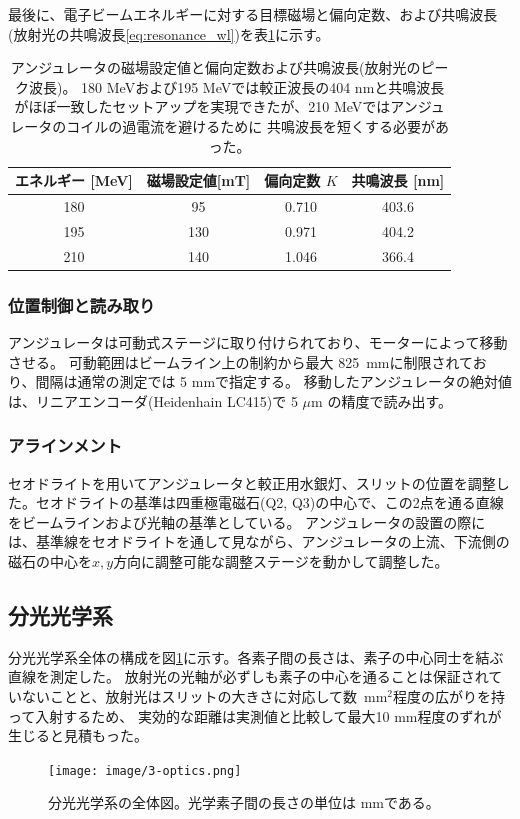 \documentclass[a4paper,11pt,uplatex]{jsbook}
\begin{document}
最後に、電子ビームエネルギーに対する目標磁場と偏向定数、および共鳴波長(放射光の共鳴波長\ref{eq:resonance_wl})を表\ref{undulator_setting}に示す。
\begin{table}[H]
  \centering
  \begin{tabular}{c|ccc}
    エネルギー [MeV]& 磁場設定値[mT]&偏向定数 $K$&共鳴波長 [nm]\\ \hline
    180 & 95  & 0.710 & 403.6\\
    195 & 130 & 0.971 & 404.2\\
    210 & 140 & 1.046 & 366.4\\
  \end{tabular}
  \caption[アンジュレータの磁場設定値]{アンジュレータの磁場設定値と偏向定数および共鳴波長(放射光のピーク波長)。
  180 MeVおよび195 MeVでは較正波長の404 nmと共鳴波長がほぼ一致したセットアップを実現できたが、210 MeVではアンジュレータのコイルの過電流を避けるために
  共鳴波長を短くする必要があった。}\label{undulator_setting}
\end{table}

\subsubsection{位置制御と読み取り}
アンジュレータは可動式ステージに取り付けられており、モーターによって移動させる。
可動範囲はビームライン上の制約から最大 825~mmに制限されており、間隔は通常の測定では 5 mmで指定する。
移動したアンジュレータの絶対値は、リニアエンコーダ(Heidenhain LC415)で 5 $\mu \text{m}$ の精度で読み出す。

\subsubsection{アラインメント}
セオドライトを用いてアンジュレータと較正用水銀灯、スリットの位置を調整した。セオドライトの基準は四重極電磁石(Q2, Q3)の中心で、この2点を通る直線をビームラインおよび光軸の基準としている。
アンジュレータの設置の際には、基準線をセオドライトを通して見ながら、アンジュレータの上流、下流側の磁石の中心を$x,y$方向に調整可能な調整ステージを動かして調整した。

\subsection{分光光学系}
分光光学系全体の構成を図\ref{fig:optics}に示す。各素子間の長さは、素子の中心同士を結ぶ直線を測定した。
放射光の光軸が必ずしも素子の中心を通ることは保証されていないことと、放射光はスリットの大きさに対応して数~mm$^2$程度の広がりを持って入射するため、
実効的な距離は実測値と比較して最大10 mm程度のずれが生じると見積もった。
\begin{figure}[h]
  \centering
  \texttt{[image: image/3-optics.png]}\\
  \caption[分光光学系の全体図]{分光光学系の全体図。光学素子間の長さの単位は mmである。}
  \label{fig:optics}
\end{figure}
\end{document}

